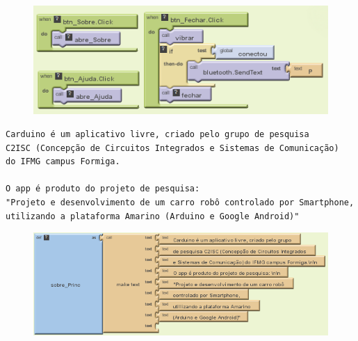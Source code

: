 \documentclass[portugues, brazil, a4paper,12pt]{article}
\begin{document}


\begin{figure}[H]
	\centering
	\includegraphics[scale=.8]{img/controle/paginas.png}
	
\end{figure}


\begin{verbatim}
Carduino é um aplicativo livre, criado pelo grupo de pesquisa 
C2ISC (Concepção de Circuitos Integrados e Sistemas de Comunicação) 
do IFMG campus Formiga.

O app é produto do projeto de pesquisa:
"Projeto e desenvolvimento de um carro robô controlado por Smartphone,
utilizando a plataforma Amarino (Arduino e Google Android)"
\end{verbatim}

\begin{figure}[H]
	\centering
	\includegraphics[scale=.8]{img/controle/textos1.png}
	
\end{figure}
\end{document}
